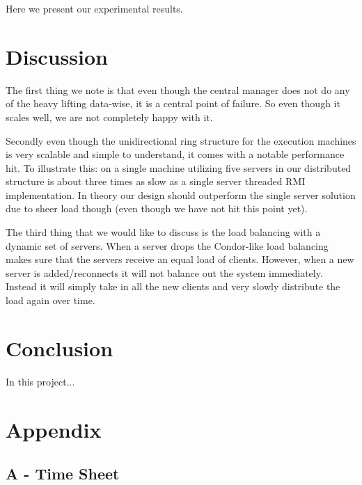 \documentclass[a4paper,10pt]{article}
\begin{document}
Here we present our experimental results.

\section{Discussion}
\label{sec:discussion}
The first thing we note is that even though the central manager does not do any of the heavy lifting data-wise, it is a central point of failure.
So even though it scales well, we are not completely happy with it.

Secondly even though the unidirectional ring structure for the execution machines is very scalable and simple to understand,
it comes with a notable performance hit.
To illustrate this: on a single machine utilizing five servers in our distributed structure is about three times as slow as a single server threaded RMI implementation.
In theory our design should outperform the single server solution due to sheer load though (even though we have not hit this point yet).

The third thing that we would like to discuss is the load balancing with a dynamic set of servers.
When a server drops the Condor-like load balancing makes sure that the servers receive an equal load of clients.
However, when a new server is added/reconnects it will not balance out the system immediately.
Instead it will simply take in all the new clients and very slowly distribute the load again over time.

\section{Conclusion}
\label{sec:conclusion}
In this project...

\newpage
\section*{Appendix}

\subsection*{A - Time Sheet}
\label{sec:appendix}



\end{document}

